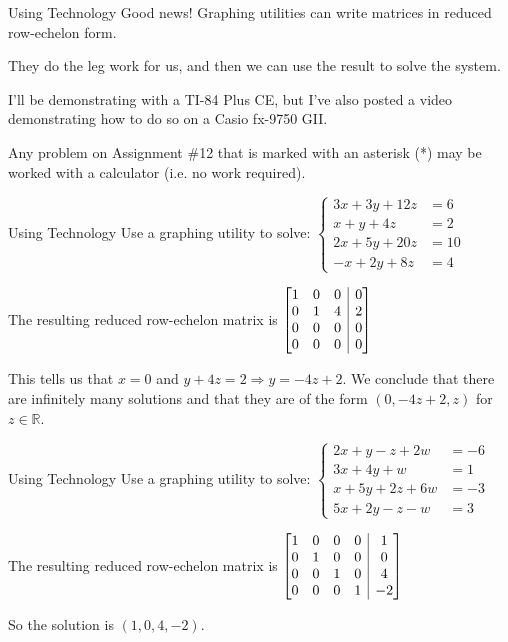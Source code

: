 \documentclass[t, aspectratio=169]{beamer}
\makeatletter
\def\R{\mathbb{R}} %
\newenvironment{amatrix}[1]{%
	\left[\begin{array}{@{}*{#1}{c}|c@{}}
	}{%
	\end{array}\right]
}
\def\then{\Rightarrow}
\makeatother
\begin{document}
	\begin{frame}{Using Technology}
		Good news! Graphing utilities can write matrices in reduced row-echelon form.
		
		They do the leg work for us, and then we can use the result to solve the system. \pause
		
		I'll be demonstrating with a TI-84 Plus CE, but I've also posted a video demonstrating how to do so on a Casio fx-9750 GII.
		
		Any problem on Assignment \#12 that is marked with an asterisk (*) may be worked with a calculator (i.e. no work required). \pause
	\end{frame}
	
	\begin{frame}{Using Technology}
		Use a graphing utility to solve: $\begin{cases}
		3x + 3y + 12z &= 6 \\ x + y + 4z &= 2 \\ 2x + 5y + 20z &= 10 \\ -x + 2y + 8z &= 4
		\end{cases}$ \pause
		
		The resulting reduced row-echelon matrix is $\begin{amatrix}{3}
		1 & 0 & 0 & 0 \\ 0 & 1 & 4 & 2 \\ 0 & 0 & 0 & 0 \\ 0 & 0 & 0 & 0
		\end{amatrix}$
		
		This tells us that $x = 0$ and $y + 4z = 2 \then y = -4z + 2$. We conclude that there are infinitely many solutions and that they are of the form $(0, -4z + 2, z)$ for $z \in \R$.
	\end{frame}
	
	\begin{frame}{Using Technology}
		Use a graphing utility to solve: $\begin{cases}
		2x + y - z + 2w &= -6 \\ 3x + 4y + w &= 1 \\ x + 5y + 2z + 6w &= -3 \\ 5x + 2y - z - w &= 3
		\end{cases}$ \pause
		
		The resulting reduced row-echelon matrix is $\begin{amatrix}{4}
		1 & 0 & 0 & 0 & 1 \\ 0 & 1 & 0 & 0 & 0 \\ 0 & 0 & 1 & 0 & 4 \\ 0 & 0 & 0 & 1 & -2
		\end{amatrix}$ \pause
		
		So the solution is $(1, 0, 4, -2)$.
	\end{frame}
	
\end{document}
